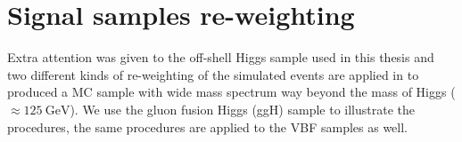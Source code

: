 \section{Signal samples re-weighting}
\label{sec:sig_rewgt}
Extra attention was given to the off-shell Higgs sample used in this thesis and two different kinds
of re-weighting of the simulated events are applied in to produced a MC sample with wide
mass spectrum way beyond the mass of Higgs ($\approx \SI{125}{\giga\electronvolt}$). We use the
gluon fusion Higgs (ggH) sample to illustrate the procedures, the same procedures are applied to
the VBF samples as well.

